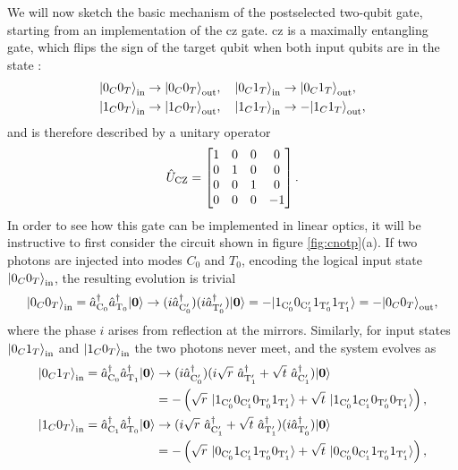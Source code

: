 We will now sketch the basic mechanism of the postselected two-qubit gate, starting from an implementation of the \gls{cz} gate. \gls{cz} is a maximally entangling gate, which flips the sign of the target qubit when both input qubits are in the state :
\begin{align}
   &\mbox{$ | 0_C0_T \rangle $}_{\mathrm{in}} \rightarrow  \mbox{$ | 0_C0_T \rangle $}_{\mathrm{out}},\quad
   \mbox{$ | 0_C1_T \rangle $}_{\mathrm{in}} \rightarrow  \mbox{$ | 0_C1_T \rangle $}_{\mathrm{out}}, \notag \\
   &\mbox{$ | 1_C0_T \rangle $}_{\mathrm{in}} \rightarrow  \mbox{$ | 1_C0_T \rangle $}_{\mathrm{out}},\quad
   \mbox{$ | 1_C1_T \rangle $}_{\mathrm{in}} \rightarrow -\mbox{$ | 1_C1_T \rangle $}_{\mathrm{out}},
   \label{eqn:cz-states}
\end{align}
and is therefore described by a unitary operator
\begin{equation}
    \hat{U}_\text{CZ}=
    \begin{bmatrix}
    1 & 0 & 0 & 0 \\
    0 & 1 & 0 & 0 \\
    0 & 0 & 1 & 0 \\
    0 & 0 & 0 & -1 \\
    \end{bmatrix}.
\end{equation}
In order to see how this gate can be implemented in linear optics, it will be instructive to first consider the circuit shown in figure \ref{fig:cnotp}(a). If two photons are injected into modes $C_0$ and $T_0$, encoding the logical input state $\mbox{$ | 0_C 0_T \rangle $}_{\mathrm{in}}$, the resulting evolution is trivial
\newcommand{\czero}{\mathrm{C_0}}
\newcommand{\cone}{\mathrm{C_1}}
\newcommand{\tzero}{\mathrm{T_0}}
\newcommand{\tone}{\mathrm{T_1}}
\newcommand{\czerop}{\mathrm{C_0'}}
\newcommand{\conep}{\mathrm{C_1'}}
\newcommand{\tzerop}{\mathrm{T_0'}}
\newcommand{\tonep}{\mathrm{T_1'}}
\begin{equation}
   \ket{0_C 0_T}_\lin = \creation_\czero \creation_\tzero \vacuum
   \rightarrow
     (i \creation_\czerop) (i \creation_\tzerop) \vacuum
     = - \ket{1_\czerop 0_\conep 1_\tzerop 1_\tonep}
     = - \ket{0_C 0_T}_\lout,
\end{equation}
where the phase $i$ arises from reflection at the mirrors. Similarly, for input states $\mbox{$ | 0_C 1_T \rangle $}_{\mathrm{in}}$ and $\mbox{$ | 1_C 0_T \rangle $}_{\mathrm{in}}$ the two photons never meet, and the system evolves as
\begin{align}
   \ket{0_C 1_T}_\lin = \creation_\czero \creation_\tone \vacuum 
   &\rightarrow
     (i \creation_\czerop) (i \sqrt{r}~ \creation_\tonep+ \sqrt{t}~ \creation_\conep) \vacuum \notag \\
     &= - \left(\sqrt{r}~\ket{1_\czerop 0_\conep 0_\tzerop 1_\tonep} + 
     \sqrt{t}~\ket{1_\czerop 1_\conep 0_\tzerop 0_\tonep}\right), \\
   \ket{1_C 0_T}_\lin = \creation_\cone \creation_\tzero \vacuum 
   &\rightarrow
     (i \sqrt{r}~\creation_\conep + \sqrt{t}~ \creation_\tonep) 
     (i \creation_\tzerop) \vacuum \notag \\
     &= - \left(\sqrt{r}~\ket{0_\czerop 1_\conep 1_\tzerop 0_\tonep} + 
     \sqrt{t}~\ket{0_\czerop 0_\conep 1_\tzerop 1_\tonep}\right), 
\end{align}
